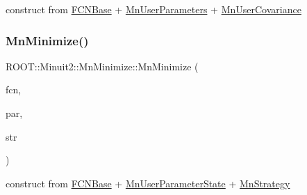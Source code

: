 construct from \mbox{\hyperlink{classROOT_1_1Minuit2_1_1FCNBase}{F\+C\+N\+Base}} + \mbox{\hyperlink{classROOT_1_1Minuit2_1_1MnUserParameters}{Mn\+User\+Parameters}} + \mbox{\hyperlink{classROOT_1_1Minuit2_1_1MnUserCovariance}{Mn\+User\+Covariance}} 

\mbox{\label{classROOT_1_1Minuit2_1_1MnMinimize_ac07d9fb89fb1a8cdef14ece12eabbfda}} 
\subsubsection{\texorpdfstring{MnMinimize()}{MnMinimize()}\hspace{0.1cm}{\footnotesize\ttfamily [6/26]}}
{\footnotesize\ttfamily R\+O\+O\+T\+::\+Minuit2\+::\+Mn\+Minimize\+::\+Mn\+Minimize (\begin{DoxyParamCaption}\item[{const \mbox{\hyperlink{classROOT_1_1Minuit2_1_1FCNBase}{F\+C\+N\+Base}} \&}]{fcn,  }\item[{const \mbox{\hyperlink{classROOT_1_1Minuit2_1_1MnUserParameterState}{Mn\+User\+Parameter\+State}} \&}]{par,  }\item[{const \mbox{\hyperlink{classROOT_1_1Minuit2_1_1MnStrategy}{Mn\+Strategy}} \&}]{str }\end{DoxyParamCaption})\hspace{0.3cm}{\ttfamily [inline]}}



construct from \mbox{\hyperlink{classROOT_1_1Minuit2_1_1FCNBase}{F\+C\+N\+Base}} + \mbox{\hyperlink{classROOT_1_1Minuit2_1_1MnUserParameterState}{Mn\+User\+Parameter\+State}} + \mbox{\hyperlink{classROOT_1_1Minuit2_1_1MnStrategy}{Mn\+Strategy}} 

\mbox{\label{classROOT_1_1Minuit2_1_1MnMinimize_a838683666517f1099a8eff7654dff3e2}} 
